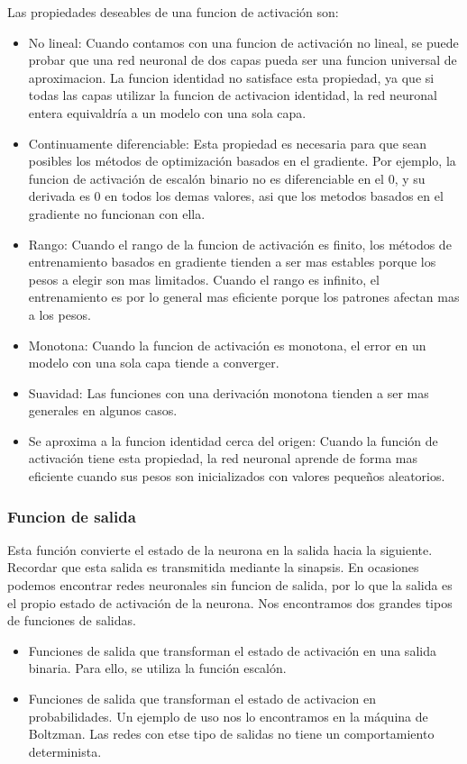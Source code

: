 Las propiedades deseables de una funcion de activación son:
\begin{itemize}
\item No lineal: Cuando contamos con una funcion de activación no lineal, se puede probar que una red neuronal de dos capas pueda ser una funcion universal de aproximacion. La funcion identidad no satisface esta propiedad, ya que si todas las capas utilizar la funcion de activacion identidad, la red neuronal entera equivaldría a un modelo con una sola capa.
\item Continuamente diferenciable: Esta propiedad es necesaria para que sean posibles los métodos de optimización basados en el gradiente. Por ejemplo, la funcion de activación de escalón binario no es diferenciable en el 0, y su derivada es 0 en todos los demas valores, asi que los metodos basados en el gradiente no funcionan con ella.
\item Rango: Cuando el rango de la funcion de activación es finito, los métodos de entrenamiento basados en gradiente tienden a ser mas estables porque los pesos a elegir son mas limitados. Cuando el rango es infinito, el entrenamiento es por lo general mas eficiente porque los patrones afectan mas a los pesos.
\item Monotona: Cuando la funcion de activación es monotona, el error en un modelo con una sola capa tiende a converger.
\item Suavidad: Las funciones con una derivación monotona tienden a ser mas generales en algunos casos.
\item Se aproxima a la funcion identidad cerca del origen: Cuando la función de activación tiene esta propiedad, la red neuronal aprende de forma mas eficiente cuando sus pesos son inicializados con valores pequeños aleatorios.
\end{itemize}

\subsubsection {Funcion de salida}
Esta función convierte el estado de la neurona en la salida hacia la siguiente. Recordar que esta salida es transmitida mediante la sinapsis. En ocasiones podemos encontrar redes neuronales sin funcion de salida, por lo que la salida es el propio estado de activación de la neurona. Nos encontramos dos grandes tipos de funciones de salidas.
\begin{itemize}
\item Funciones de salida que transforman el estado de activación en una salida binaria. Para ello, se utiliza la función escalón.
\item Funciones de salida que transforman el estado de activacion en probabilidades. Un ejemplo de uso nos lo encontramos en la máquina de Boltzman. Las redes con etse tipo de salidas no tiene un comportamiento determinista.
\end{itemize}


